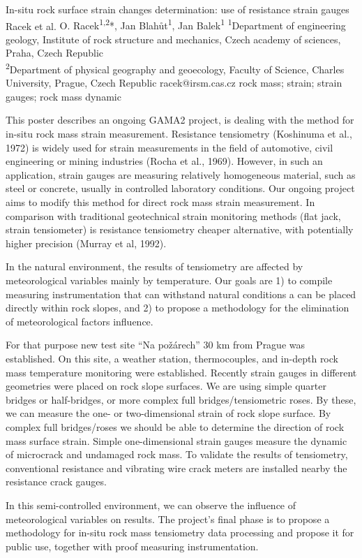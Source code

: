 \abstract
{In-situ rock surface strain changes determination: use of resistance strain gauges} 
{Racek et al.} 
{O. Racek\textsuperscript{1,2}*, Jan Blahůt\textsuperscript{1}, Jan Balek\textsuperscript{1}} 
{\POtag} 
{
\textsuperscript{1}Department of engineering geology, Institute of rock structure and mechanics, Czech academy of sciences, Praha, Czech Republic\\
\textsuperscript{2}Department of physical geography and geoecology, Faculty of Science, Charles University, Prague, Czech Republic
}
{racek@irsm.cas.cz}  %
{rock mass; strain; strain gauges; rock mass dynamic}
{This poster describes an ongoing GAMA2 project, is dealing with the method for in-situ rock mass strain measurement. Resistance tensiometry (Koshinuma et al., 1972) is widely used for strain measurements in the field of automotive, civil engineering or mining industries (Rocha et al., 1969). However, in such an application, strain gauges are measuring relatively homogeneous material, such as steel or concrete, usually in controlled laboratory conditions. Our ongoing project aims to modify this method for direct rock mass strain measurement. In comparison with traditional geotechnical strain monitoring methods (flat jack, strain tensiometer) is resistance tensiometry cheaper alternative, with potentially higher precision (Murray et al, 1992).

In the natural environment, the results of tensiometry are affected by meteorological variables mainly by temperature. Our goals are 1) to compile measuring instrumentation that can withstand natural conditions a can be placed directly within rock slopes, and 2) to propose a methodology for the elimination of meteorological factors influence. 

For that purpose new test site \enquote{Na požárech} 30 km from Prague was established. On this site, a weather station, thermocouples, and in-depth rock mass temperature monitoring were established. Recently strain gauges in different geometries were placed on rock slope surfaces. We are using simple quarter bridges or half-bridges, or more complex full bridges/tensiometric roses. By these, we can measure the one- or two-dimensional strain of rock slope surface. By complex full bridges/roses we should be able to determine the direction of rock mass surface strain. Simple one-dimensional strain gauges measure the dynamic of microcrack and undamaged rock mass. To validate the results of tensiometry, conventional resistance and vibrating wire crack meters are installed nearby the resistance crack gauges. 

In this semi-controlled environment, we can observe the influence of meteorological variables on results. The project’s final phase is to propose a methodology for in-situ rock mass tensiometry data processing and propose it for public use, together with proof measuring instrumentation. 
}
